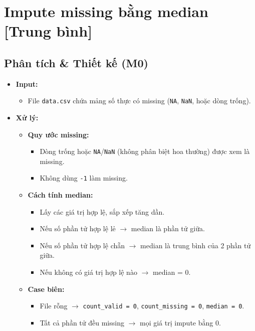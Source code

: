 \section{Impute missing bằng median [Trung bình]}

\subsection{Phân tích \& Thiết kế (M0)}
\begin{itemize}
    \item \textbf{Input:}
    \begin{itemize}
        \item File \texttt{data.csv} chứa mảng số thực có missing (\texttt{NA}, \texttt{NaN}, hoặc dòng trống).
    \end{itemize}

    \item \textbf{Xử lý:}
    \begin{itemize}
        \item \textbf{Quy ước missing:}
        \begin{itemize}
            \item Dòng trống hoặc \texttt{NA}/\texttt{NaN} (không phân biệt hoa thường) được xem là missing.
            \item Không dùng \texttt{-1} làm missing.
        \end{itemize}

        \item \textbf{Cách tính median:}
        \begin{itemize}
            \item Lấy các giá trị hợp lệ, sắp xếp tăng dần.
            \item Nếu số phần tử hợp lệ lẻ $\rightarrow$ median là phần tử giữa.
            \item Nếu số phần tử hợp lệ chẵn $\rightarrow$ median là trung bình của 2 phần tử giữa.
            \item Nếu không có giá trị hợp lệ nào $\rightarrow$ median = 0.
        \end{itemize}

        \item \textbf{Case biên:}
        \begin{itemize}
            \item File rỗng $\rightarrow$ \texttt{count\_valid = 0}, \texttt{count\_missing = 0}, \texttt{median = 0}.
            \item Tất cả phần tử đều missing $\rightarrow$ mọi giá trị impute bằng 0.
        \end{itemize}


\end{itemize}
\end{itemize}
